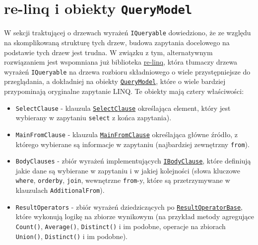 \section{re-linq i obiekty \texttt{QueryModel}}
W sekcji traktującej o drzewach wyrażeń \texttt{IQueryable} dowiedziono, że ze względu na skomplikowaną strukturę tych drzew, budowa zapytania docelowego na podstawie tych drzew jest trudna. W związku z tym, alternatywnym rozwiązaniem jest wspomniana już biblioteka \href{https://github.com/re-motion/Relinq}{re-linq}, która tłumaczy drzewa wyrażeń \texttt{IQueryable} na drzewa rozbioru składniowego o wiele przystępniejsze do przeglądania, a dokładniej na obiekty \href{https://github.com/re-motion/Relinq/blob/82fdca6a4bfd942bb4a71dd20ab9c5af0aea0541/Core/QueryModel.cs}{\texttt{QueryModel}}, które o wiele bardziej przypominają oryginalne zapytanie LINQ. Te obiekty mają cztery właściwości:

\begin{itemize}
\item \texttt{SelectClause} - klauzula \href{https://github.com/re-motion/Relinq/blob/82fdca6a4bfd942bb4a71dd20ab9c5af0aea0541/Core/Clauses/SelectClause.cs}{\texttt{SelectClause}} określająca element, który jest wybierany w zapytaniu \texttt{select} z końca zapytania).
\item \texttt{MainFromClause} - klauzula \href{https://github.com/re-motion/Relinq/blob/82fdca6a4bfd942bb4a71dd20ab9c5af0aea0541/Core/Clauses/MainFromClause.cs}{\texttt{MainFromClause}} określająca główne źródło, z którego wybierane są informacje w zapytaniu (najbardziej zewnętrzny \texttt{from}).
\item \texttt{BodyClauses} - zbiór wyrażeń implementujących \href{https://github.com/re-motion/Relinq/blob/82fdca6a4bfd942bb4a71dd20ab9c5af0aea0541/Core/Clauses/IBodyClause.cs}{\texttt{IBodyClause}}, które definiują jakie dane są wybierane w zapytaniu i w jakiej kolejności (słowa kluczowe \texttt{where}, \texttt{orderby}, \texttt{join}, wewnętrzne \texttt{from}-y, które są przetrzymywane w klauzulach \texttt{AdditionalFrom}).
\item \texttt{ResultOperators} - zbiór wyrażeń dziedziczących po \href{https://github.com/re-motion/Relinq/blob/82fdca6a4bfd942bb4a71dd20ab9c5af0aea0541/Core/Clauses/ResultOperatorBase.cs}{\texttt{ResultOperatorBase}}, które wykonują logikę na zbiorze wynikowym (na przykład metody agregujące \texttt{Count()}, \texttt{Average()}, \texttt{Distinct()} i im podobne, operacje na zbiorach \texttt{Union()}, \texttt{Distinct()} i im podobne).
\end{itemize} %

